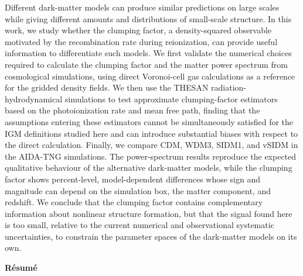 \documentclass[%
 reprint,
nofootinbib,
 amsmath,amssymb,
 aps,
]{revtex4-2}
\begin{document}
\begin{center}
\begin{minipage}{0.82\textwidth}
\noindent
Different dark-matter models can produce similar predictions on large scales while giving different amounts and distributions of small-scale structure. In this work, we study whether the clumping factor, a density-squared observable motivated by the recombination rate during reionization, can provide useful information to differentiate such models. We first validate the numerical choices required to calculate the clumping factor and the matter power spectrum from cosmological simulations, using direct Voronoi-cell gas calculations as a reference for the gridded density fields. We then use the THESAN radiation-hydrodynamical simulations to test approximate clumping-factor estimators based on the photoionization rate and mean free path, finding that the assumptions entering these estimators cannot be simultaneously satisfied for the IGM definitions studied here and can introduce substantial biases with respect to the direct calculation. Finally, we compare CDM, WDM3, SIDM1, and vSIDM in the AIDA-TNG simulations. The power-spectrum results reproduce the expected qualitative behaviour of the alternative dark-matter models, while the clumping factor shows percent-level, model-dependent differences whose sign and magnitude can depend on the simulation box, the matter component, and redshift. We conclude that the clumping factor contains complementary information about nonlinear structure formation, but that the signal found here is too small, relative to the current numerical and observational systematic uncertainties, to constrain the parameter spaces of the dark-matter models on its own.

\vspace{0.8cm}

\begin{center}
    {\large\bfseries R\'esum\'e\par}
\end{center}

\vspace{0.3cm}


\end{minipage}
\end{center}
\end{document}
